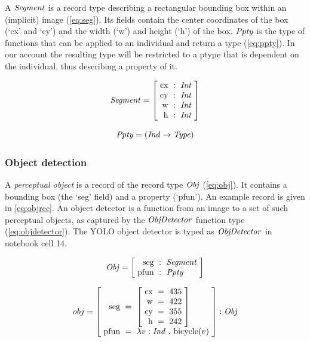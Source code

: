 A $\mathit{Segment}$ is a record type describing a rectangular bounding box within an (implicit) image (\autoref{eq:seg}).
Its fields contain the center coordinates of the box (`cx' and `cy') and the width (`w') and height (`h') of the box.
$\mathit{Ppty}$ is the type of functions that can be applied to an individual and return a type (\autoref{eq:ppty}).
In our account the resulting type will be restricted to a ptype that is dependent on the individual, thus describing a property of it.

\begin{equation}\label{eq:seg}
\type{Segment} = \rec{
\text{cx} &:& \type{Int}\\
\text{cy} &:& \type{Int}\\
\text{w} &:& \type{Int}\\
\text{h} &:& \type{Int}
}\end{equation}

\begin{equation}\label{eq:ppty}
\mathit{Ppty} = (\mathit{Ind} \rightarrow \mathit{Type})\end{equation}




\subsubsection{Object detection}

A \textit{perceptual object} is a record of the record type $\mathit{Obj}$ (\autoref{eq:obj}).
It contains a bounding box (the `seg' field) and a property (`pfun').
An example record is given in \autoref{eq:objrec}.
An object detector is a function from an image to a set of such perceptual objects, as captured by the $\mathit{ObjDetector}$ function type (\autoref{eq:objdetector}).
The YOLO object detector is typed as $\mathit{ObjDetector}$ in notebook cell 14.


\begin{equation}\label{eq:obj}
\type{Obj} = \rec{
\text{seg} &:& \type{Segment}\\
\text{pfun} &:& \type{Ppty} \\
}\end{equation}

\begin{equation}\label{eq:objrec}
obj =
\rec{
\text{seg} &=& \rec{
\text{cx} &=& 435\\
\text{w} &=& 422\\
\text{cy} &=& 355\\
\text{h} &=& 242
}\\
\text{pfun} &=& \lambda v:\type{Ind}\ .\ \text{bicycle}(v)\\
} : \type{Obj}\end{equation}

